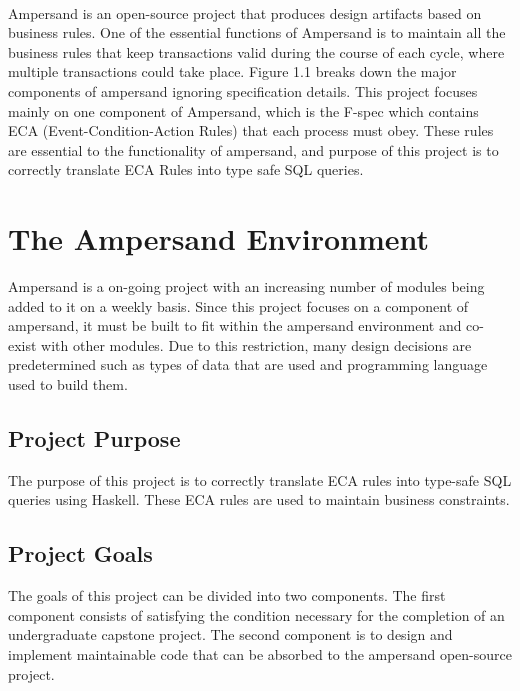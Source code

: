 \documentclass[12pt]{report}
\begin{document}
\paragraph{}
Ampersand is an open-source project that produces design artifacts based on 
business rules. One of the essential functions of Ampersand is to maintain all 
the business rules that keep transactions valid during the course of each 
cycle, where multiple transactions could take place.  Figure 1.1  breaks 
down the major components of ampersand ignoring specification details. This 
project focuses mainly on one component of Ampersand, which is the F-spec which 
contains ECA (Event-Condition-Action Rules) that each process must obey. These 
rules are essential to the functionality of ampersand, and purpose of this 
project is to correctly translate ECA Rules into type safe SQL queries.
{\section{The Ampersand Environment}\label{sec:Purpose}}
Ampersand is a on-going project with an increasing number of modules being
added to it on a weekly basis. Since this project focuses on a component of 
ampersand, it must be built to fit within the ampersand environment and 
co-exist with other modules. Due to this restriction, many design decisions are 
predetermined such as types of data that are used and programming language used 
to build them.
\subsection{Project Purpose}
The purpose of this project is to correctly translate ECA rules
 into type-safe SQL queries using Haskell. These ECA rules are used to 
maintain business constraints.
\subsection{Project Goals} 
The goals of this project can be divided into two components. The first 
component consists of satisfying the condition necessary for the completion of 
an undergraduate capstone project. The second component is to design and 
implement maintainable code that can be absorbed to the ampersand open-source 
project. 
\end{document}
